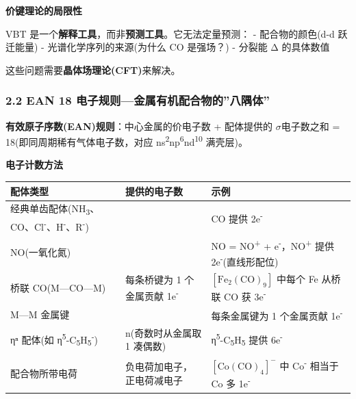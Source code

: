 \documentclass[a4paper,11pt]{ctexart}
\newcounter{none}
\newcommand{\箭}{\ensuremath{\rightarrow}}
\newcommand{\左箭}{\ensuremath{\leftarrow}}
\newcommand{\上箭}{\ensuremath{\uparrow}}
\newcommand{\下箭}{\ensuremath{\downarrow}}
\newcommand{\衡}{\ensuremath{\rightleftharpoons}}
\newcommand{\双箭}{\ensuremath{\leftrightarrow}}
\newcommand{\约等于}{\ensuremath{\approx}}
\newcommand{\小于等于}{\ensuremath{\leq}}
\newcommand{\大于等于}{\ensuremath{\geq}}
\newcommand{\不等于}{\ensuremath{\neq}}
\newcommand{\西格马}{\ensuremath{\sigma}}
\newcommand{\派}{\ensuremath{\pi}}
\begin{document}
\textbf{价键理论的局限性}

VBT 是一个\textbf{解释工具}，而非\textbf{预测工具}。它无法定量预测：
- 配合物的颜色(d-d 跃迁能量)
- 光谱化学序列的来源(为什么 CO 是强场？)
- 分裂能 Δ 的具体数值

这些问题需要\textbf{晶体场理论(CFT)}来解决。

\subsubsection{2.2 EAN 18 电子规则---金属有机配合物的''八隅体''}\label{ean-18-ux7535ux5b50ux89c4ux5219ux91d1ux5c5eux6709ux673aux914dux5408ux7269ux7684ux516bux9685ux4f53}

\textbf{有效原子序数(EAN)规则}：中心金属的价电子数 + 配体提供的 \西格马 电子数之和 = 18(即同周期稀有气体电子数，对应 ns\textsuperscript{2}np\textsuperscript{6}nd\textsuperscript{10} 满壳层)。

\textbf{电子计数方法}

{\def\LTcaptype{none} %
\begin{longtable}[]{@{}
  >{\raggedright\arraybackslash}p{}
  >{\centering\arraybackslash}p{}
  >{\raggedright\arraybackslash}p{}@{}}
\toprule\noalign{}
\begin{minipage}[b]{\linewidth}\raggedright
配体类型
\end{minipage} & \begin{minipage}[b]{\linewidth}\centering
提供的电子数
\end{minipage} & \begin{minipage}[b]{\linewidth}\raggedright
示例
\end{minipage} \\
\midrule\noalign{}
\endhead
\bottomrule\noalign{}
\endlastfoot
经典单齿配体(NH\textsubscript{3}、CO、Cl\textsuperscript{-}、H\textsuperscript{-}、R\textsuperscript{-}) & 2 & CO 提供 2e\textsuperscript{-} \\
NO(一氧化氮) & 3 & NO = NO\textsuperscript{+} + e\textsuperscript{-}，NO\textsuperscript{+} 提供 2e\textsuperscript{-}(直线形配位) \\
桥联 CO(M---CO---M) & 每条桥键为 1 个金属贡献 1e\textsuperscript{-} & \([\mathrm{Fe_2(CO)_9}]\) 中每个 Fe 从桥联 CO 获 3e\textsuperscript{-} \\
M---M 金属键 & 1 & 每条金属键为 1 个金属贡献 1e\textsuperscript{-} \\
ηⁿ 配体(如 η\textsuperscript{5}-C\textsubscript{5}H\textsubscript{5}\textsuperscript{-}) & n(奇数时从金属取 1 凑偶数) & η\textsuperscript{5}-C\textsubscript{5}H\textsubscript{5} 提供 6e\textsuperscript{-} \\
配合物所带电荷 & 负电荷加电子，正电荷减电子 & \([\mathrm{Co(CO)_4}]^-\) 中 Co\textsuperscript{-} 相当于 Co 多 1e\textsuperscript{-} \\
\end{longtable}
}
\end{document}
